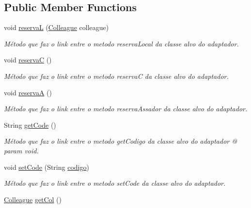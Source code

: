 \subsection*{Public Member Functions}
\begin{DoxyCompactItemize}
\item 
void \mbox{\hyperlink{classadapter_pattern_1_1futsal_adapter_a00b5a3952a49e80ee156d62a7b59e372}{reservaL}} (\mbox{\hyperlink{classmediator_pattern_1_1_colleague}{Colleague}} colleague)
\begin{DoxyCompactList}\small\item\em Método que faz o link entre o metodo reserva\+Local da classe alvo do adaptador. \end{DoxyCompactList}\item 
void \mbox{\hyperlink{classadapter_pattern_1_1futsal_adapter_a154a41741f8c2bda7552797ada4915e3}{reservaC}} ()
\begin{DoxyCompactList}\small\item\em Método que faz o link entre o metodo reservaC da classe alvo do adaptador. \end{DoxyCompactList}\item 
void \mbox{\hyperlink{classadapter_pattern_1_1futsal_adapter_a8c447ed3eb57e8f6789219be1cba92fe}{reservaA}} ()
\begin{DoxyCompactList}\small\item\em Método que faz o link entre o metodo reserva\+Assador da classe alvo do adaptador. \end{DoxyCompactList}\item 
String \mbox{\hyperlink{classadapter_pattern_1_1futsal_adapter_a7d21aebfd57eb0eaf4aa51e9c8c24fb1}{get\+Code}} ()
\begin{DoxyCompactList}\small\item\em Método que faz o link entre o metodo get\+Codigo da classe alvo do adaptador @ param void. \end{DoxyCompactList}\item 
void \mbox{\hyperlink{classadapter_pattern_1_1futsal_adapter_a63b50886ea0df5062fdeb086811c22ba}{set\+Code}} (String \mbox{\hyperlink{classtemplate_pattern_1_1futsal_game_a1fe3c56de8ecfc3514aaf9150b2fd134}{codigo}})
\begin{DoxyCompactList}\small\item\em Método que faz o link entre o metodo set\+Code da classe alvo do adaptador. \end{DoxyCompactList}\item 
\mbox{\hyperlink{classmediator_pattern_1_1_colleague}{Colleague}} \mbox{\hyperlink{classadapter_pattern_1_1futsal_adapter_adaffc04b294957e46799734741430eb4}{get\+Col}} ()

\end{DoxyCompactItemize}
